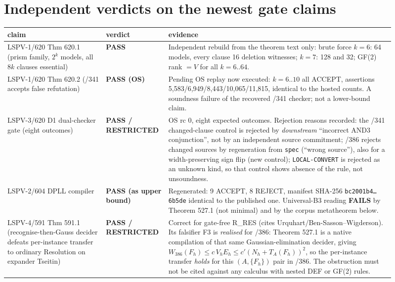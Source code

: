 \documentclass[11pt]{article}
\begin{document}
\section{Independent verdicts on the newest gate claims}
\begin{center}
\begin{tabular}{p{0.24\linewidth}p{0.12\linewidth}p{0.55\linewidth}}\toprule
claim & verdict & evidence\\\midrule
LSPV-1/620 Thm 620.1 (prism family, $2^k$ models, all $8k$ clauses essential) & \textbf{PASS} &
Independent rebuild from the theorem text only: brute force $k=6$: 64 models, every clause
16 deletion witnesses; $k=7$: 128 and 32; GF(2) rank $=V$ for all $k=6..64$.\\
LSPV-1/620 Thm 620.2 (/341 accepts false refutation) & \textbf{PASS (OS)} & Pending OS replay now
executed: $k=6..10$ all ACCEPT, assertions 5{,}583/6{,}949/8{,}443/10{,}065/11{,}815, identical to the
hosted counts. A soundness failure of the recovered /341 checker; not a lower-bound claim.\\
LSPV-3/620 D1 dual-checker gate (eight outcomes) & \textbf{PASS / RESTRICTED} & OS rc 0, eight
expected outcomes. Rejection reasons recorded: the /341 changed-clause control is rejected by
\emph{downstream} ``incorrect AND3 conjunction'', not by an independent source commitment; /386
rejects changed sources by regeneration from \texttt{spec} (``wrong source''), also for a
width-preserving sign flip (new control); \texttt{LOCAL-CONVERT} is rejected as an unknown kind,
so that control shows absence of the rule, not unsoundness.\\
LSPV-2/604 DPLL compiler & \textbf{PASS (as upper bound)} & Regenerated: 9 ACCEPT, 8 REJECT,
manifest SHA-256 \texttt{bc2001b4\ldots 6b5de} identical to the published one. Universal-B3 reading
\textbf{FAILS} by Theorem 527.1 (not minimal) and by the corpus metatheorem below.\\
LSPV-4/591 Thm 591.1 (recognise-then-Gauss decider defeats per-instance transfer to ordinary
Resolution on expander Tseitin) & \textbf{PASS / RESTRICTED} & Correct for gate-free R\_RES (cites
Urquhart/Ben-Sasson--Wigderson). Its falsifier F3 is \emph{realised} for /386: Theorem 527.1 is a
native compilation of that same Gaussian-elimination decider, giving
$W_{386}(F_h)\le c\,V_hE_h\le c'(N_h+T_A(F_h))^{2}$, so the per-instance transfer \emph{holds} for this
$(A,\{F_h\})$ pair in /386. The obstruction must not be cited against any calculus with nested DEF or
GF(2) rules.\\\bottomrule
\end{tabular}
\end{center}
\end{document}
